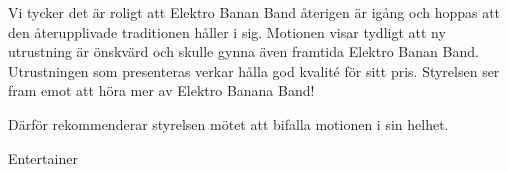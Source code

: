 \documentclass[../_main/handlingar.tex]{subfiles}
\begin{document}
\motionssvar

Vi tycker det är roligt att Elektro Banan Band återigen är igång och hoppas att den återupplivade traditionen håller i sig. Motionen visar tydligt att ny utrustning är önskvärd och skulle gynna även framtida Elektro Banan Band. Utrustningen som presenteras verkar hålla god kvalité för sitt pris. Styrelsen ser fram emot att höra mer av Elektro Banana Band!

Därför rekommenderar styrelsen mötet att bifalla motionen i sin helhet.


\begin{signatures}{1}
    \ist
    \signature{\ent}{Entertainer}
\end{signatures}
\end{document}
